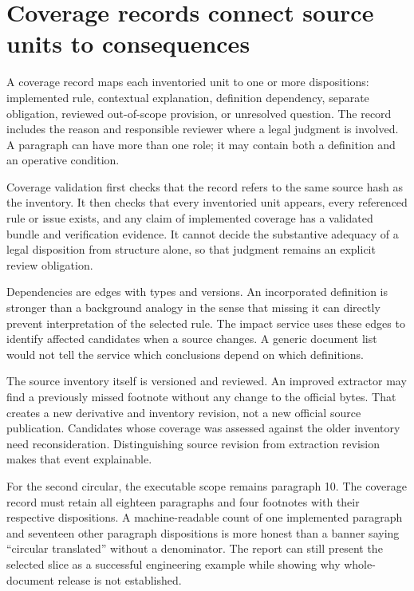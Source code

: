 \section{Coverage records connect source units to consequences}
\label{merge:M08:05}


A coverage record maps each inventoried unit to one or more dispositions:
implemented rule, contextual explanation, definition dependency, separate
obligation, reviewed out-of-scope provision, or unresolved question. The record
includes the reason and responsible reviewer where a legal judgment is involved.
A paragraph can have more than one role; it may contain both a definition and an
operative condition.

Coverage validation first checks that the record refers to the same source hash
as the inventory. It then checks that every inventoried unit appears, every
referenced rule or issue exists, and any claim of implemented coverage has a
validated bundle and verification evidence. It cannot decide the substantive
adequacy of a legal disposition from structure alone, so that judgment remains
an explicit review obligation.

Dependencies are edges with types and versions. An incorporated definition is
stronger than a background analogy in the sense that missing it can directly
prevent interpretation of the selected rule. The impact service uses these edges
to identify affected candidates when a source changes. A generic document list
would not tell the service which conclusions depend on which definitions.

The source inventory itself is versioned and reviewed. An improved extractor may
find a previously missed footnote without any change to the official bytes. That
creates a new derivative and inventory revision, not a new official source
publication. Candidates whose coverage was assessed against the older inventory
need reconsideration. Distinguishing source revision from extraction revision
makes that event explainable.

For the second circular, the executable scope remains paragraph 10. The coverage
record must retain all eighteen paragraphs and four footnotes with their
respective dispositions. A machine-readable count of one implemented paragraph
and seventeen other paragraph dispositions is more honest than a banner saying
``circular translated'' without a denominator. The report can still present the
selected slice as a successful engineering example while showing why whole-
document release is not established.


